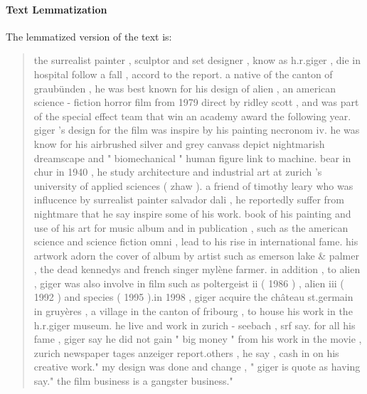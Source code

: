 \paragraph{Text Lemmatization}
The lemmatized version of the text is:
\begin{quote}
    the surrealist painter , sculptor and set designer , know as h.r.giger , die in hospital follow a fall ,
    accord to the report. a native of the canton of graubünden , he was best known for his design of alien ,
    an american science - fiction horror film from 1979 direct by ridley scott ,
    and was part of the special effect team that win an academy award the following year.
    giger ’s design for the film was inspire by his painting necronom iv.
    he was know for his airbrushed silver and grey canvass depict nightmarish dreamscape
    and " biomechanical " human figure link to machine. bear in chur in 1940 ,
    he study architecture and industrial art at zurich ’s university of applied sciences ( zhaw ).
    a friend of timothy leary who was influcence by surrealist painter salvador dali ,
    he reportedly suffer from nightmare that he say inspire some of his work.
    book of his painting and use of his art for music album and in publication ,
    such as the american science and science fiction omni , lead to his rise in international fame.
    his artwork adorn the cover of album by artist such as emerson lake \& palmer ,
    the dead kennedys and french singer mylène farmer.
    in addition , to alien , giger was also involve in film such as poltergeist ii ( 1986 )
    , alien iii ( 1992 ) and species ( 1995 ).in 1998 , giger acquire the château st.germain in gruyères ,
    a village in the canton of fribourg , to house his work in the h.r.giger museum.
    he live and work in zurich - seebach , srf say. for all his fame ,
    giger say he did not gain " big money " from his work in the movie ,
    zurich newspaper tages anzeiger report.others , he say , cash in on his creative work."
    my design was done and change , " giger is quote as having say."
    the film business is a gangster business."
\end{quote}

